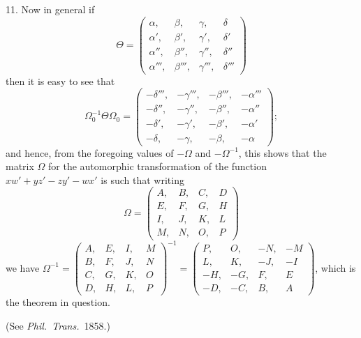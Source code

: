 \documentclass[11pt,a4paper]{article}
\theoremstyle{plain}
\begin{document}
11. Now in general if
\[
\Theta =
\begin{pmatrix}
\alpha, & \beta, & \gamma, & \delta \\
\alpha', & \beta', & \gamma', & \delta' \\
\alpha'', & \beta'', & \gamma'', & \delta'' \\
\alpha''', & \beta''', & \gamma''', & \delta'''
\end{pmatrix}
\]
then it is easy to see that
\[
\Omega_0^{-1}\Theta\Omega_0 =
\begin{pmatrix}
-\delta''', & -\gamma''', & -\beta''', & -\alpha''' \\
-\delta'', & -\gamma'', & -\beta'', & -\alpha'' \\
-\delta', & -\gamma', & -\beta', & -\alpha' \\
-\delta, & -\gamma, & -\beta, & -\alpha
\end{pmatrix};
\]
and hence, from the foregoing values of $-\Omega$ and $-\Omega^{-1}$, this shows that the matrix $\Omega$ for the automorphic transformation of the function $xw' + yz' - zy' - wx'$ is such that writing
\[
\Omega =
\begin{pmatrix}
A, & B, & C, & D \\
E, & F, & G, & H \\
I, & J, & K, & L \\
M, & N, & O, & P
\end{pmatrix}
\]
we have $\Omega^{-1} =
\begin{pmatrix}
A, & E, & I, & M \\
B, & F, & J, & N \\
C, & G, & K, & O \\
D, & H, & L, & P
\end{pmatrix}^{-1} =
\begin{pmatrix}
P, & O, & -N, & -M \\
L, & K, & -J, & -I \\
-H, & -G, & F, & E \\
-D, & -C, & B, & A
\end{pmatrix}$,
which is the theorem in question.

(See \textit{Phil.\ Trans.}\ 1858.)
\end{document}
